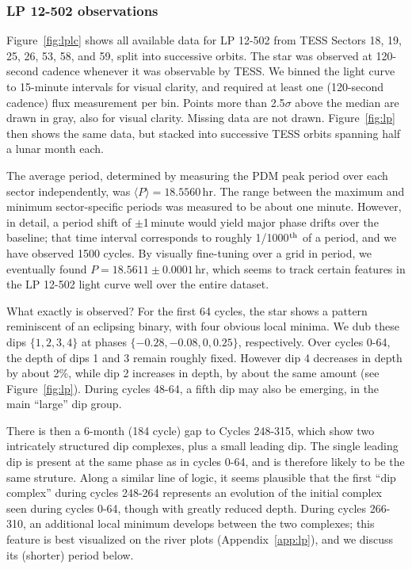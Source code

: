 \documentclass[11pt,twocolumn,tighten]{aastex63}
\begin{document}
\subsubsection{LP 12-502 observations}
\label{subsec:lpobservations}

Figure~\ref{fig:lplc} shows all available data for LP 12-502 from TESS
Sectors 18, 19, 25, 26, 53, 58, and 59, split into successive orbits.
The star was observed at 120-second cadence whenever it was observable
by TESS.  We binned the light curve to 15-minute intervals for visual
clarity, and required at least one (120-second cadence) flux
measurement per bin.  Points more than 2.5$\sigma$ above the median
are drawn in gray, also for visual clarity.  Missing data are not
drawn.  Figure~\ref{fig:lp} then shows the same data, but stacked into
successive TESS orbits spanning half a lunar month each.

The average period, determined by measuring the PDM peak period over
each sector independently, was $\langle P \rangle = 18.5560$\,hr.  The
range between the maximum and minimum sector-specific periods was
measured to be about one minute.   However, in detail, a period shift
of $\pm$1\,minute would yield major phase drifts over the baseline;
that time interval corresponds to roughly 1/1000$^{\rm th}$ of a
period, and we have observed 1500 cycles.  By visually fine-tuning
over a grid in period, we eventually found $P=18.5611 \pm 0.0001$\,hr,
which seems to track certain features in the LP 12-502 light curve
well over the entire dataset.

What exactly is observed?  For the first 64 cycles, the star shows a
pattern reminiscent of an eclipsing binary, with four obvious local
minima.  We dub these dips $\{ 1, 2, 3, 4 \}$ at phases $\{ -0.28,
-0.08, 0, 0.25 \}$, respectively.  Over cycles 0-64, the depth of dips
1 and 3 remain roughly fixed.  However dip 4 decreases in depth by
about 2\%, while dip 2 increases in depth, by about the same amount
(see Figure~\ref{fig:lp}).  During cycles 48-64, a fifth dip may also
be emerging, in the main ``large'' dip group.

There is then a 6-month (184 cycle) gap to Cycles 248-315, which show
two intricately structured dip complexes, plus a small leading dip.
The single leading dip is present at the same phase as in cycles 0-64,
and is therefore likely to be the same struture.  Along a similar line
of logic, it seems plausible that the first ``dip complex'' during
cycles 248-264 represents an evolution of the initial complex seen
during cycles 0-64, though with greatly reduced depth.  During cycles
266-310, an additional local minimum develops between the two
complexes; this feature is best visualized on the river plots
(Appendix~\ref{app:lp}), and we discuss its (shorter) period below.
\end{document}
